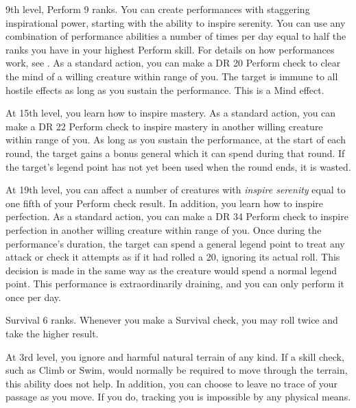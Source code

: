     \featpres 9th level, Perform 9 ranks.
    \featben You can create performances with staggering inspirational power, starting with the ability to inspire serenity.
    You can use any combination of performance abilities a number of times per day equal to half the ranks you have in your highest Perform skill.
    For details on how performances work, see .
     As a standard action, you can make a DR 20 Perform check to clear the mind of a willing creature within \rngmed range of you.
    The target is immune to all hostile  effects as long as you sustain the performance.
    This is a Mind effect.

    At 15th level, you learn how to inspire mastery.
     As a standard action, you can make a DR 22 Perform check to inspire mastery in another willing creature within \rngmed range of you.
    As long as you sustain the performance, at the start of each round, the target gains a bonus general  which it can spend during that round.
    If the target's legend point has not yet been used when the round ends, it is wasted.

    At 19th level, you can affect a number of creatures with \textit{inspire serenity} equal to one fifth of your Perform check result.
    In addition, you learn how to inspire perfection.
     As a standard action, you can make a DR 34 Perform check to inspire perfection in another willing creature within \rngmed range of you.
    Once during the performance's duration, the target can spend a general legend point to treat any attack or check it attempts as if it had rolled a 20, ignoring its actual roll.
    This decision is made in the same way as the creature would spend a normal legend point.
    This performance is extraordinarily draining, and you can only perform it once per day.

    \featpre Survival 6 ranks.
    \featben Whenever you make a Survival check, you may roll twice and take the higher result.

    At 3rd level, you ignore  and harmful natural terrain of any kind.
    If a skill check, such as Climb or Swim, would normally be required to move through the terrain, this ability does not help.
    In addition, you can choose to leave no trace of your passage as you move.
    If you do, tracking you is impossible by any physical means.

